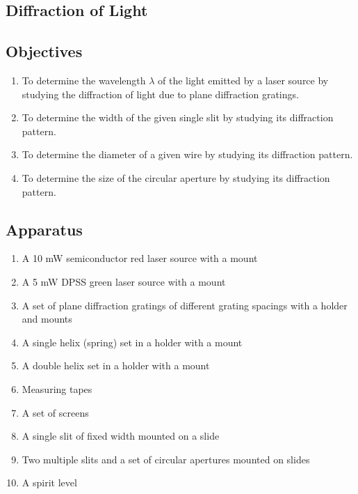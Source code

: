 \begin{refsection}
\chapter{Diffraction of Light}

\section*{Objectives}

\begin{enumerate}
    \item To determine the wavelength $\lambda$ of the light emitted by a laser source by studying the diffraction of light due to plane diffraction gratings.
    \item To determine the width of the given single slit by studying its diffraction pattern.
    \item To determine the diameter of a given wire by studying its diffraction pattern.
    \item To determine the size of the circular aperture by studying its diffraction pattern.
\end{enumerate}



\section*{Apparatus}

\begin{enumerate}
    \item A 10 mW semiconductor red laser source with a mount
    \item A 5 mW DPSS green laser source with a mount
    \item A set of plane diffraction gratings of different grating spacings with a holder and mounts
    \item A single helix (spring) set in a holder with a mount
    \item A double helix set in a holder with a mount
    \item Measuring tapes
    \item A set of screens 
    \item A single slit of fixed width mounted on a slide
    \item Two multiple slits and a set of circular apertures mounted on slides
    \item A spirit level
\end{enumerate}


\end{refsection}
